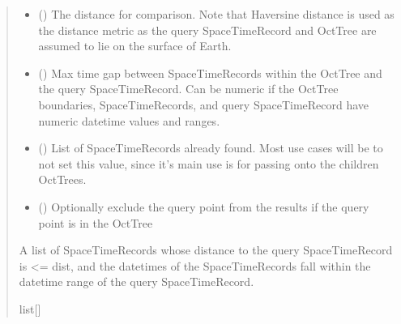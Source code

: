 \documentclass[letterpaper,10pt,english]{sphinxmanual}
\begin{document}
\begin{fulllineitems}
\begin{fulllineitems}
\begin{quote}
\begin{description}
\begin{itemize}
\item {}
\sphinxAtStartPar
{} () \textendash{} The distance for comparison. Note that Haversine distance is used
as the distance metric as the query SpaceTimeRecord and OctTree are
assumed to lie on the surface of Earth.

\item {}
\sphinxAtStartPar
{} () \textendash{} Max time gap between SpaceTimeRecords within the OctTree and the
query SpaceTimeRecord. Can be numeric if the OctTree boundaries,
SpaceTimeRecords, and query SpaceTimeRecord have numeric datetime
values and ranges.

\item {}
\sphinxAtStartPar
{} (\sphinxstyleliteralemphasis{\sphinxupquote{{[}}}{\hyperref[\detokenize{record:geotrees.record.SpaceTimeRecord}]{\sphinxcrossref{\sphinxstyleliteralemphasis{\sphinxupquote{SpaceTimeRecord}}}}}\sphinxstyleliteralemphasis{\sphinxupquote{{]} }}\sphinxstyleliteralemphasis{\sphinxupquote{| }}) \textendash{} List of SpaceTimeRecords already found. Most use cases will be to
not set this value, since it’s main use is for passing onto the
children OctTrees.

\item {}
\sphinxAtStartPar
{} () \textendash{} Optionally exclude the query point from the results if the query
point is in the OctTree

\end{itemize}

\sphinxAtStartPar
A list of SpaceTimeRecords whose distance to the
query SpaceTimeRecord is \textless{}= dist, and the datetimes of the
SpaceTimeRecords fall within the datetime range of the query
SpaceTimeRecord.

\sphinxAtStartPar
list{[}{\hyperref[\detokenize{record:geotrees.record.SpaceTimeRecord}]{}}{]}

\end{description}\end{quote}


\end{fulllineitems}
\end{fulllineitems}
\end{document}
